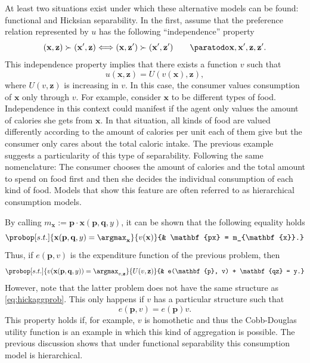 \documentclass[english, a4paper, 12pt]{article}
\begin{document}
At least two situations exist under which these alternative models can be found: functional and Hicksian separability. In the first, assume that the preference relation represented by $u$ has the following ``independence'' property
	\begin{equation} \label{eq:indepPref}
		(\mathbf{x}, \mathbf{z}) \succ (\mathbf{x}', \mathbf{z}) 
			\Longleftrightarrow
		(\mathbf{x}, \mathbf{z}') \succ (\mathbf{x}', \mathbf{z}') \qquad \paratodo \mathbf{x}, \mathbf{x}', \mathbf{z}, \mathbf{z}'.
	\end{equation}
This independence property implies that there exists a function $v$ such that
	$$u(\mathbf{x}, \mathbf{z}) = U(v(\mathbf{x}), \mathbf{z}),$$
where $U(v,\mathbf{z})$ is increasing in $v$. In this case, the consumer values consumption of $\mathbf{x}$ only through $v$. For example, consider $\mathbf{x}$ to be different types of food. Independence in this context could manifest if the agent only values the amount of calories she gets from $\mathbf{x}$. In that situation, all kinds of food are valued differently according to the amount of calories per unit each of them give but the consumer only cares about the total caloric intake. The previous example suggests a particularity of this type of separability. Following the same nomenclature: The consumer chooses the amount of calories and the total amount to spend on food first and then she decides the individual consumption of each kind of food. Models that show this feature are often referred to as hierarchical consumption models.

By calling $m_{\mathbf{x}} := \mathbf{p}\cdot \mathbf{x}(\mathbf{p}, \mathbf{q}, y)$, it can be shown that the following equality holds
	$$\probop[s.t.]{\mathbf{x}(\mathbf{p}, \mathbf{q}, y) = \argmax_{\mathbf{x}}}{v(\mathbf{x})}
					{&	\mathbf{px} = m_{\mathbf{x}}.}$$
Thus, if $e(\mathbf{p}, v)$ is the expenditure function of the previous problem, then
	$$	\probop[s.t.]{v(\mathbf{x}(\mathbf{p}, \mathbf{q}, y)) = \argmax_{v, \mathbf{z}}}{U(v, \mathbf{z})}
				{&	e(\mathbf{p}, v) + \mathbf{qz} = y.}
	$$
However, note that the latter problem does not have the same structure as \eqref{eq:hickaggprob}. This only happens if $v$ has a particular structure such that 
	$$e(\mathbf{p}, v) = e(\mathbf{p})v.$$
This property holds if, for example, $v$ is homothetic and thus the Cobb-Douglas utility function is an example in which this kind of aggregation is possible. The previous discussion shows that under functional separability this consumption model is hierarchical.
\end{document}
